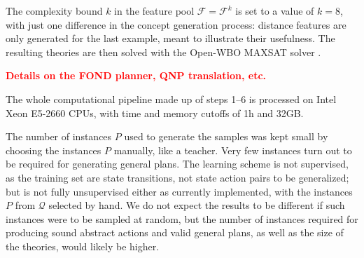 \documentclass[letterpaper]{article} %
\newcommand{\alert}[1]{\textcolor{red}{\bf #1}}
\newcommand{\Q}{\mathcal{Q}}
\begin{document}
%

The complexity bound $k$ in the feature pool $\mathcal{F} = \mathcal{F}^k$ is set to a value of $k=8$,
with just one difference in the concept generation process: distance features are only generated for the last example,
meant to illustrate their usefulness.
The resulting theories are then solved with the Open-WBO MAXSAT solver \cite{martins2014open}.

\alert{Details on the FOND planner, QNP translation, etc.}

The whole computational pipeline made up of steps 1--6 is processed on Intel Xeon E5-2660 CPUs,
with time and memory cutoffs of 1h and 32GB.

The number of instances $P$ used to generate the samples was kept small
by choosing the instances $P$ manually, like a teacher.
Very few instances turn out to be required for generating general plans.
The learning scheme is not supervised, as the training set are state
transitions, not state action pairs to be generalized; but is not fully unsupervised either as currently
implemented, with the instances $P$ from $\Q$ selected by hand.
We do not expect the results to be different if such instances
were to be sampled at random, but the number of instances required for
producing sound abstract actions and valid general plans, as well as the size of the
theories, would likely be higher.
\end{document}
